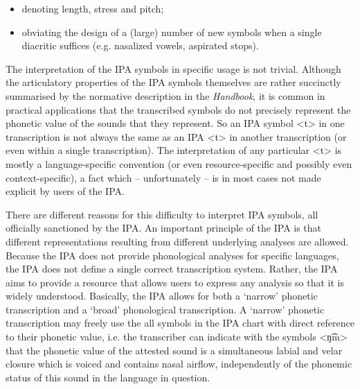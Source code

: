 \begin{itemize}

 	\item denoting length, stress and pitch;
	\item obviating the design of a (large) number of new symbols when a 
		  single diacritic suffices (e.g. nasalized vowels, aspirated stops). 
               
\end{itemize}	

The interpretation of the IPA symbols in specific usage is not trivial. Although
the articulatory properties of the IPA symbols themselves are rather succinctly
summarised by the normative description in the \textit{Handbook}, it is common
in practical applications that the transcribed symbols do not precisely
represent the phonetic value of the sounds that they represent. So an IPA symbol
<t> in one transcription is not always the same as an IPA <t> in another
transcription (or even within a single transcription). The interpretation of any
particular <t> is mostly a language-specific convention (or even
resource-specific and possibly even context-specific), a fact which --
unfortunately -- is in most cases not made explicit by users of the IPA.

There are different reasons for this difficulty to interpret IPA symbols, all
officially sanctioned by the IPA. An important principle of the IPA is that
different representations resulting from different underlying analyses are
allowed. Because the IPA does not provide phonological analyses for specific
languages, the IPA does not define a single correct transcription system.
Rather, the IPA aims to provide a resource that allows users to express any
analysis so that it is widely understood. Basically, the IPA allows for both a 
`narrow' phonetic transcription and a `broad' phonological transcription. 
A `narrow' phonetic transcription may freely use the all symbols in the IPA 
chart with direct reference to their phonetic value, i.e. the transcriber can 
indicate with the symbols <ŋ͡m> that the phonetic value of the attested sound 
is a simultaneous labial and velar closure which is voiced and contains nasal 
airflow, independently of the phonemic status of this sound in the language in 
question. 


